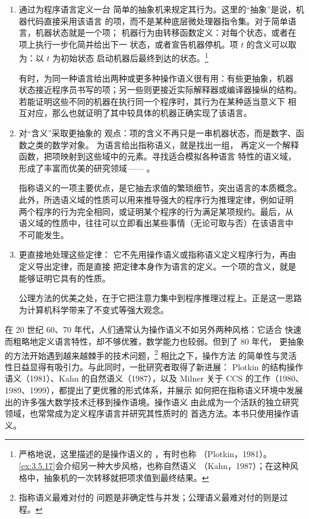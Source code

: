 \begin{enumerate}
  \item {}通过为程序语言定义一台
    简单的抽象机来规定其行为。这里的“抽象”是说，机器代码直接采用该语言
    的项，而不是某种底层微处理器指令集。对于简单语言，机器状态就是一个项；
    机器行为由转移函数定义：对每个状态，或者在项上执行一步化简并给出下一
    状态，或者宣告机器停机。项 \(t\) 的含义可以取为：以 \(t\) 为初始状态
    启动机器后最终到达的状态。\footnote{严格地说，这里描述的是操作语义的
    ，有时也称
    （Plotkin，1981）。\cref{ex:3.5.17}会介绍另一种大步风格，也称自然语义
    （Kahn，1987）；在这种风格中，抽象机的一次转移就把项求值到最终结果。}

    有时，为同一种语言给出两种或更多种操作语义很有用：有些更抽象，机器
    状态接近程序员书写的项；另一些则更接近实际解释器或编译器操纵的结构。
    若能证明这些不同的机器在执行同一个程序时，其行为在某种适当意义下
    相互对应，那么也就证明了其中较具体的机器正确实现了该语言。

  \item {}对“含义”采取更抽象的
    观点：项的含义不再只是一串机器状态，而是数字、函数之类的数学对象。
    为语言给出指称语义，就是找出一组，
    再定义一个解释函数，把项映射到这些域中的元素。寻找适合模拟各种语言
    特性的语义域，形成了丰富而优美的研究领域——
    。

    指称语义的一项主要优点，是它抽去求值的繁琐细节，突出语言的本质概念。
    此外，所选语义域的性质可以用来推导强大的程序行为推理定律，例如证明
    两个程序的行为完全相同，或证明某个程序的行为满足某项规约。最后，从
    语义域的性质中，往往可以立即看出某些事情（无论可取与否）在该语言中
    不可能发生。

  \item {}更直接地处理这些定律：
    它不先用操作语义或指称语义定义程序行为，再由定义导出定律，而是直接
    把定律本身作为语言的定义。一个项的含义，就是能够证明它具有的性质。

    公理方法的优美之处，在于它把注意力集中到程序推理过程上。正是这一思路
    为计算机科学带来了不变式等强大观念。
\end{enumerate}

在 20 世纪 60、70 年代，人们通常认为操作语义不如另外两种风格：它适合
快速而粗略地定义语言特性，却不够优雅，数学能力也较弱。但到了 80 年代，
更抽象的方法开始遇到越来越棘手的技术问题，\footnote{指称语义最难对付的
问题是非确定性与并发；公理语义最难对付的则是过程。} 相比之下，操作方法
的简单性与灵活性日益显得有吸引力。与此同时，一批研究者取得了新进展：
Plotkin 的结构操作语义（1981）、Kahn 的自然语义（1987），以及 Milner
关于 CCS 的工作（1980、1989、1999），都提出了更优雅的形式体系，并展示
如何把在指称语义环境中发展出的许多强大数学技术迁移到操作语境。操作语义
由此成为一个活跃的独立研究领域，也常常成为定义程序语言并研究其性质时的
首选方法。本书只使用操作语义。

